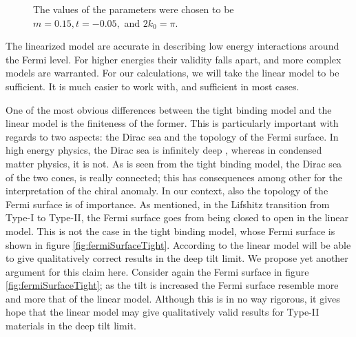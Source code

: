 \begin{figure}[ht]
  \caption{The values of the parameters were chosen to be \(m=0.15, t=-0.05, \) and \(2 k_{0}=\pi\).\label{fig:ridgeline2}}
\end{figure}


The linearized model are accurate in describing low energy interactions around the Fermi level.
For higher energies their validity falls apart, and more complex models are warranted.
For our calculations, we will take the linear model to be sufficient.
It is much easier to work with, and sufficient in most cases.

One of the most obvious differences between the tight binding model and the linear model is the finiteness of the former.
This is particularly important with regards to two aspects: the Dirac sea and the topology of the Fermi surface.
In high energy physics, the Dirac sea is infinitely deep \cite{vozmedianoTheoreticalPhysicsColloquium2021}, whereas in condensed matter physics, it is not.
As is seen from the tight binding model, the Dirac sea of the two cones, is really connected;
this has consequences among other for the interpretation of the chiral anomaly.
In our context, also the topology of the Fermi surface is of importance.
As mentioned, in the Lifshitz transition from Type-I to Type-II, the Fermi surface goes from being closed to open in the linear model.
This is not the case in the tight binding model, whose Fermi surface is shown in figure \ref{fig:fermiSurfaceTight}.
According to \textcite{ferreirosAnomalousNernstThermal2017} the linear model will be able to give qualitatively correct results in the deep tilt limit.
We propose yet another argument for this claim here.
Consider again the Fermi surface in figure \ref{fig:fermiSurfaceTight};
as the tilt is increased the Fermi surface resemble more and more that of the linear model.
Although this is in no way rigorous, it gives hope that the linear model may give qualitatively valid results for Type-II materials in the deep tilt limit.

